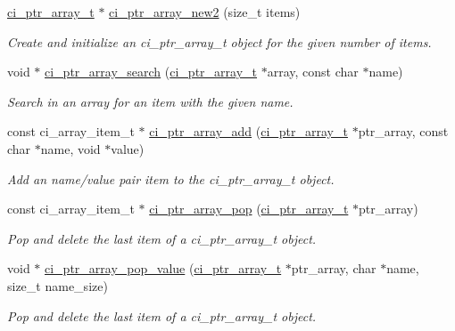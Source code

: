 \begin{DoxyCompactItemize}
\item 
\hyperlink{group__PTR__ARRAYS_gacc2dabd40cf8cfb19cbcd73156a4cf3c}{ci\_\-ptr\_\-array\_\-t} $\ast$ \hyperlink{group__PTR__ARRAYS_ga367de955f3f27b4abd93516f3222a897}{ci\_\-ptr\_\-array\_\-new2} (size\_\-t items)
\begin{DoxyCompactList}\small\item\em Create and initialize an ci\_\-ptr\_\-array\_\-t object for the given number of items. \item\end{DoxyCompactList}\item 
void $\ast$ \hyperlink{group__PTR__ARRAYS_ga0f704014af3083ddc87184a32f899467}{ci\_\-ptr\_\-array\_\-search} (\hyperlink{group__PTR__ARRAYS_gacc2dabd40cf8cfb19cbcd73156a4cf3c}{ci\_\-ptr\_\-array\_\-t} $\ast$array, const char $\ast$name)
\begin{DoxyCompactList}\small\item\em Search in an array for an item with the given name. \item\end{DoxyCompactList}\item 
const ci\_\-array\_\-item\_\-t $\ast$ \hyperlink{group__PTR__ARRAYS_gadf1a428806069e4d640dc7011ab3a340}{ci\_\-ptr\_\-array\_\-add} (\hyperlink{group__PTR__ARRAYS_gacc2dabd40cf8cfb19cbcd73156a4cf3c}{ci\_\-ptr\_\-array\_\-t} $\ast$ptr\_\-array, const char $\ast$name, void $\ast$value)
\begin{DoxyCompactList}\small\item\em Add an name/value pair item to the ci\_\-ptr\_\-array\_\-t object. \item\end{DoxyCompactList}\item 
const ci\_\-array\_\-item\_\-t $\ast$ \hyperlink{group__PTR__ARRAYS_gaca1303a4e9fe24620879cdb0e5cbfa67}{ci\_\-ptr\_\-array\_\-pop} (\hyperlink{group__PTR__ARRAYS_gacc2dabd40cf8cfb19cbcd73156a4cf3c}{ci\_\-ptr\_\-array\_\-t} $\ast$ptr\_\-array)
\begin{DoxyCompactList}\small\item\em Pop and delete the last item of a ci\_\-ptr\_\-array\_\-t object. \item\end{DoxyCompactList}\item 
void $\ast$ \hyperlink{group__PTR__ARRAYS_ga91642fd37d3b991079414228b795fa8f}{ci\_\-ptr\_\-array\_\-pop\_\-value} (\hyperlink{group__PTR__ARRAYS_gacc2dabd40cf8cfb19cbcd73156a4cf3c}{ci\_\-ptr\_\-array\_\-t} $\ast$ptr\_\-array, char $\ast$name, size\_\-t name\_\-size)
\begin{DoxyCompactList}\small\item\em Pop and delete the last item of a ci\_\-ptr\_\-array\_\-t object. \item\end{DoxyCompactList}\end{DoxyCompactItemize}


